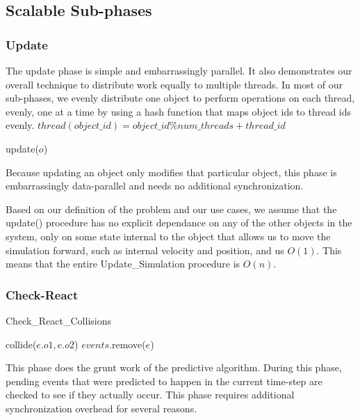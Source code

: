 \documentclass[CEJCS,PDF]{cej} %
\begin{document}
\subsection{Scalable Sub-phases}
\label{sec:subphase}

\subsubsection{Update}
\label{sub:update}
The update phase is simple and embarrassingly parallel.  It also demonstrates our overall technique to distribute work equally to multiple threads.  In most of our sub-phases,
we evenly distribute one object to perform operations on each thread, evenly, one at a time by using a hash function that maps object ids to thread ids evenly. $thread(object\_id) = object\_id \% num\_threads + thread\_id$
\begin{algorithmic}
	\STATE update($o$)
\ENDFOR
\end{algorithmic}

Because updating an object only modifies that particular object, this phase is embarrassingly data-parallel and needs no additional synchronization.

Based on our definition of the problem and our use cases, we assume that the update() procedure has no explicit dependance on any of the other objects
in the system, only on some state internal to the object that allows us to move the simulation forward, such as internal velocity and position, and us $O(1)$.  This means
that the entire Update\_Simulation procedure is $O(n)$.
\subsubsection{Check-React}
\label{sub:checkreact}
\begin{algorithm}
\caption{Check\_React\_Collisions}
\begin{algorithmic}
\STATE {}
	\STATE {}
		\STATE {}
		\STATE collide($e.o1,e.o2$)
	\ENDIF
	\STATE {}
	\STATE $events$.remove($e$)
\ENDFOR
\end{algorithmic}
\end{algorithm}
This phase does the grunt work of the predictive algorithm.  During this phase, pending events that were predicted to happen in the current time-step are checked to see if they actually occur.  This phase requires additional synchronization overhead for several reasons.
\end{document}
